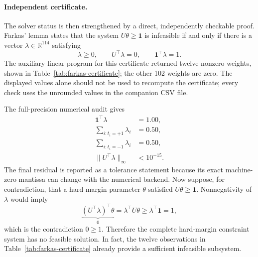 \documentclass[11pt,a4paper]{article}
\numberwithin{equation}{section} %
\begin{document}
\paragraph{Independent certificate.}
The solver status is then strengthened by a direct, independently checkable
proof. Farkas' lemma states that the system
$U\theta\geq\mathbf{1}$ is infeasible if and only if there is a vector
$\lambda\in\mathbb{R}^{114}$ satisfying
\begin{equation}
    \lambda\geq0,\qquad
    U^\top\lambda=0,\qquad
    \mathbf{1}^\top\lambda=1.
\end{equation}
The auxiliary linear program for this certificate returned twelve nonzero
weights, shown in Table~\ref{tab:farkas-certificate}; the other 102 weights
are zero. The displayed values alone should not be used to recompute the
certificate; every check uses the unrounded values in the companion CSV file.

\begin{table}[htbp]
\centering
\caption{Nonzero weights in the full-data Farkas infeasibility certificate.}
\label{tab:farkas-certificate}
\scriptsize

\end{table}

The full-precision numerical audit gives
\begin{equation}
\begin{aligned}
\mathbf{1}^\top\lambda&=1.00,\\
\sum_{i:t_i=+1}\lambda_i&=0.50,\\
\sum_{i:t_i=-1}\lambda_i&=0.50,\\
\lVert U^\top\lambda\rVert_\infty&<10^{-15}.
\end{aligned}
\end{equation}
The final residual is reported
as a tolerance statement because its exact machine-zero mantissa can change
with the numerical backend. Now suppose, for
contradiction, that a hard-margin parameter $\theta$ satisfied
$U\theta\geq\mathbf{1}$. Nonnegativity of $\lambda$ would imply
\begin{equation}
\underbrace{(U^\top\lambda)^\top\theta}_{0}
=\lambda^\top U\theta
\geq\lambda^\top\mathbf{1}
=1,
\end{equation}
which is the contradiction $0\geq1$. Therefore the complete hard-margin
constraint system has no feasible solution. In fact, the twelve observations
in Table~\ref{tab:farkas-certificate} already provide a sufficient
infeasible subsystem.
\end{document}
